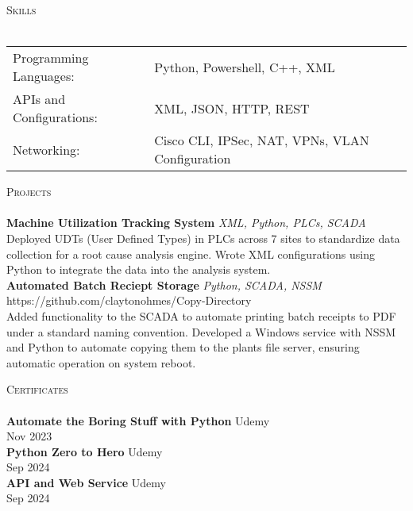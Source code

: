 \documentclass[a4paper]{article}
\newcommand{\lineunder} {
    \vspace*{-8pt} \\
    \hspace*{-18pt} \hrulefill \\
}
\newcommand{\header} [1] {
    {\hspace*{-18pt}\vspace*{6pt} \textsc{#1}}
    \vspace*{-6pt} \lineunder
}
\begin{document}
\header{Skills}
\begin{tabular}{ l l }
	Programming Languages:   & Python, Powershell, C++, XML                    \\
	APIs and Configurations: & XML, JSON, HTTP, REST                           \\
	Networking:              & Cisco CLI, IPSec, NAT, VPNs, VLAN Configuration \\
\end{tabular}
\vspace{2mm}

\header{Projects}
{\textbf{Machine Utilization Tracking System}} {\sl XML, Python, PLCs, SCADA} \\
Deployed UDTs (User Defined Types) in PLCs across 7 sites to standardize data collection for a root cause analysis engine. Wrote XML configurations using Python to integrate the data into the analysis system.\\
\vspace*{2mm}
{\textbf{Automated Batch Reciept Storage}} {\sl Python, SCADA, NSSM} \hfill https://github.com/claytonohmes/Copy-Directory\\
Added functionality to the SCADA to automate printing batch receipts to PDF under a standard naming convention. Developed a Windows service with NSSM and Python to automate copying them to the plant\textquotesingle{}s file server, ensuring automatic operation on system reboot.\\
\vspace*{2mm}

\header{Certificates}
\textbf{Automate the Boring Stuff with Python} \hfill Udemy\\
\hfill Nov 2023\\
\vspace*{2mm}
\textbf{Python Zero to Hero} \hfill Udemy\\
\hfill Sep 2024\\
\vspace*{2mm}
\textbf{API and Web Service} \hfill Udemy\\
\hfill Sep 2024\\
\vspace*{2mm}

\ 
\end{document}
